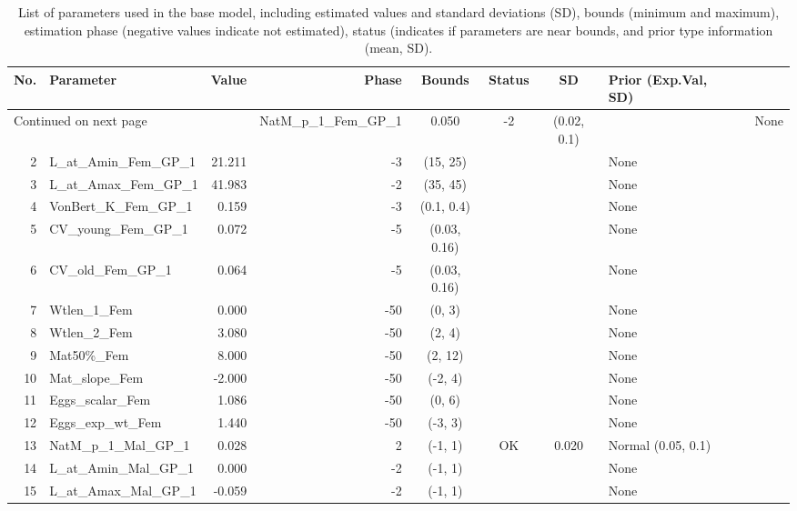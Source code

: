 \documentclass[12pt,]{article}
\begin{document}
\begin{landscape}
\begin{longtable}{rlrrcccl}
\caption{List of parameters used in
                                              the base model, including estimated 
                                              values and standard deviations (SD), 
                                              bounds (minimum and maximum), 
                                              estimation phase (negative values indicate
                                              not estimated), status (indicates if 
                                              parameters are near bounds, and prior type
                                              information (mean, SD).} \\ 
  \hline
No. & Parameter & Value & Phase & Bounds & Status & SD & Prior (Exp.Val, SD)  \\ 
  \hline 
\endhead 
\hline 
\multicolumn{3}{l}{\footnotesize Continued on next page} 
\endfoot 
\endlastfoot 
 \hline
1 & NatM\_p\_1\_Fem\_GP\_1 & 0.050 & -2 & (0.02, 0.1) &  &  & None \\ 
  2 & L\_at\_Amin\_Fem\_GP\_1 & 21.211 & -3 & (15, 25) &  &  & None \\ 
  3 & L\_at\_Amax\_Fem\_GP\_1 & 41.983 & -2 & (35, 45) &  &  & None \\ 
  4 & VonBert\_K\_Fem\_GP\_1 & 0.159 & -3 & (0.1, 0.4) &  &  & None \\ 
  5 & CV\_young\_Fem\_GP\_1 & 0.072 & -5 & (0.03, 0.16) &  &  & None \\ 
  6 & CV\_old\_Fem\_GP\_1 & 0.064 & -5 & (0.03, 0.16) &  &  & None \\ 
  7 & Wtlen\_1\_Fem & 0.000 & -50 & (0, 3) &  &  & None \\ 
  8 & Wtlen\_2\_Fem & 3.080 & -50 & (2, 4) &  &  & None \\ 
  9 & Mat50\%\_Fem & 8.000 & -50 & (2, 12) &  &  & None \\ 
  10 & Mat\_slope\_Fem & -2.000 & -50 & (-2, 4) &  &  & None \\ 
  11 & Eggs\_scalar\_Fem & 1.086 & -50 & (0, 6) &  &  & None \\ 
  12 & Eggs\_exp\_wt\_Fem & 1.440 & -50 & (-3, 3) &  &  & None \\ 
  13 & NatM\_p\_1\_Mal\_GP\_1 & 0.028 & 2 & (-1, 1) & OK & 0.020 & Normal (0.05, 0.1) \\ 
  14 & L\_at\_Amin\_Mal\_GP\_1 & 0.000 & -2 & (-1, 1) &  &  & None \\ 
  15 & L\_at\_Amax\_Mal\_GP\_1 & -0.059 & -2 & (-1, 1) &  &  & None \\ 

\end{longtable}
\end{landscape}
\end{document}

